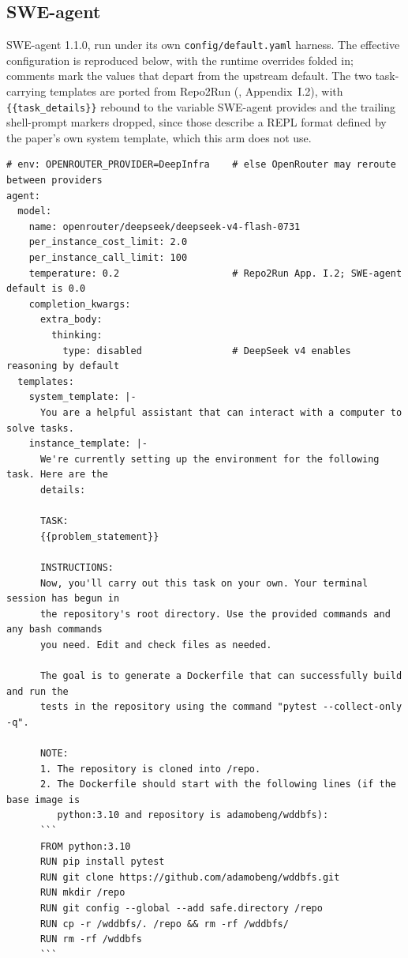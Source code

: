 \subsection{SWE-agent}
\label{app:baseline-sweagent}

SWE-agent 1.1.0, run under its own \texttt{config/default.yaml} harness. The
effective configuration is reproduced below, with the runtime overrides folded
in; comments mark the values that depart from the upstream default. The two
task-carrying templates are ported from Repo2Run (\citealp{repo2run},
Appendix~I.2), with \texttt{\{\{task\_details\}\}} rebound to the variable
SWE-agent provides and the trailing shell-prompt markers dropped, since those
describe a REPL format defined by the paper's own system template, which this
arm does not use.

\begin{lstlisting}[style=promptstyle]
# env: OPENROUTER_PROVIDER=DeepInfra    # else OpenRouter may reroute between providers
agent:
  model:
    name: openrouter/deepseek/deepseek-v4-flash-0731
    per_instance_cost_limit: 2.0
    per_instance_call_limit: 100
    temperature: 0.2                    # Repo2Run App. I.2; SWE-agent default is 0.0
    completion_kwargs:
      extra_body:
        thinking:
          type: disabled                # DeepSeek v4 enables reasoning by default
  templates:
    system_template: |-
      You are a helpful assistant that can interact with a computer to solve tasks.
    instance_template: |-
      We're currently setting up the environment for the following task. Here are the
      details:

      TASK:
      {{problem_statement}}

      INSTRUCTIONS:
      Now, you'll carry out this task on your own. Your terminal session has begun in
      the repository's root directory. Use the provided commands and any bash commands
      you need. Edit and check files as needed.

      The goal is to generate a Dockerfile that can successfully build and run the
      tests in the repository using the command "pytest --collect-only -q".

      NOTE:
      1. The repository is cloned into /repo.
      2. The Dockerfile should start with the following lines (if the base image is
         python:3.10 and repository is adamobeng/wddbfs):
      ```
      FROM python:3.10
      RUN pip install pytest
      RUN git clone https://github.com/adamobeng/wddbfs.git
      RUN mkdir /repo
      RUN git config --global --add safe.directory /repo
      RUN cp -r /wddbfs/. /repo && rm -rf /wddbfs/
      RUN rm -rf /wddbfs
      ```


\end{lstlisting}
